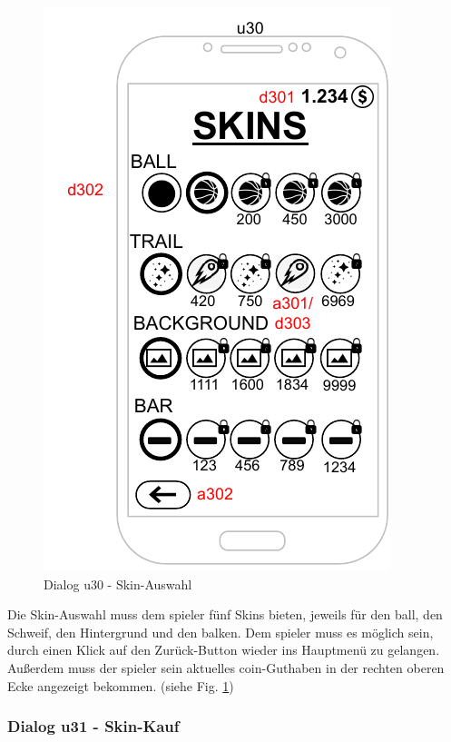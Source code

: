 \begin{figure}[h!]
    \begin{center}
    \includegraphics[scale=1.4]{diagramme/pdf/Mockup-u30.pdf}
    \end{center}
    \caption{Dialog u30 - Skin-Auswahl}\label{fig:dia:u30}
\end{figure}

Die Skin-Auswahl muss dem \gls{spieler} fünf Skins bieten, jeweils für den \gls{ball}, den Schweif, den Hintergrund und den \gls{balken}.
Dem \gls{spieler} muss es möglich sein, durch einen Klick auf den Zurück-Button wieder ins Hauptmenü zu gelangen.
Außerdem muss der \gls{spieler} sein aktuelles \gls{coin}-Guthaben in der rechten oberen Ecke angezeigt bekommen.
(siehe Fig. \ref{fig:dia:u30})
\clearpage

\subsubsection{Dialog u31 - Skin-Kauf}\label{dialog:skinkauf}

